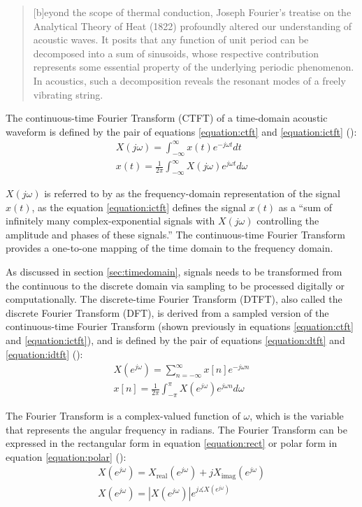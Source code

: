 \documentclass[report.tex]{subfiles}
\begin{document}
\begin{quote}
	[b]eyond the scope of thermal conduction, Joseph Fourier's treatise on the Analytical Theory of Heat (1822) profoundly altered our understanding of acoustic waves. It posits that any function of unit period can be decomposed into a sum of sinusoids, whose respective contribution represents some essential property of the underlying periodic phenomenon. In acoustics, such a decomposition reveals the resonant modes of a freely vibrating string.
\end{quote}

The continuous-time Fourier Transform (CTFT) of a time-domain acoustic waveform is defined by the pair of equations \ref{equation:ctft} and \ref{equation:ictft} (\cite[Chapter~11]{dspfirst}):
\begin{align}
	X(j\omega) = \int_{-\infty}^{\infty}{x(t)e^{-j\omega t}\mathit{dt}} \tag{1}\label{equation:ctft} \\
	x(t) = \frac{1}{2\pi}\int_{-\infty}^{\infty}{X(j\omega)e^{j\omega t}\mathit{d\omega}} \tag{2}\label{equation:ictft}
\end{align}

$X(j\omega)$ is referred to by \textcite{dspfirst} as the frequency-domain representation of the signal $x(t)$, as the equation \ref{equation:ictft} defines the signal $x(t)$ as a ``sum of infinitely many complex-exponential signals with $X(j\omega)$ controlling the amplitude and phases of these signals.'' The continuous-time Fourier Transform provides a one-to-one mapping of the time domain to the frequency domain.

As discussed in section \ref{sec:timedomain}, signals needs to be transformed from the continuous to the discrete domain via sampling to be processed digitally or computationally. The discrete-time Fourier Transform (DTFT), also called the discrete Fourier Transform (DFT), is derived from a sampled version of the continuous-time Fourier Transform (shown previously in equations \ref{equation:ctft} and \ref{equation:ictft}), and is defined by the pair of equations \ref{equation:dtft} and \ref{equation:idtft} (\cite[Chapter~12]{melbook}):
\begin{align}
	X(e^{j\omega}) = \sum_{n = -\infty}^{\infty}{x[n]e^{-j\omega n}} \tag{3}\label{equation:dtft} \\
	x[n] = \frac{1}{2\pi}\int_{-\pi}^{\pi}{X(e^{j\omega})e^{j\omega n}\mathit{d\omega}} \tag{4}\label{equation:idtft}
\end{align}

The Fourier Transform is a complex-valued function of $\omega$, which is the variable that represents the angular frequency in radians. The Fourier Transform can be expressed in the rectangular form in equation \ref{equation:rect} or polar form in equation \ref{equation:polar} (\cite[Chapter~2]{discretebook}):
\begin{align}
	X(e^{j\omega}) = X_{\text{real}}(e^{j\omega}) + j X_{\text{imag}}(e^{j\omega}) \tag{5}\label{equation:rect} \\
	X(e^{j\omega}) = |X(e^{j\omega})|e^{j\measuredangle X(e^{j\omega})} \tag{6}\label{equation:polar}
\end{align}
\end{document}

